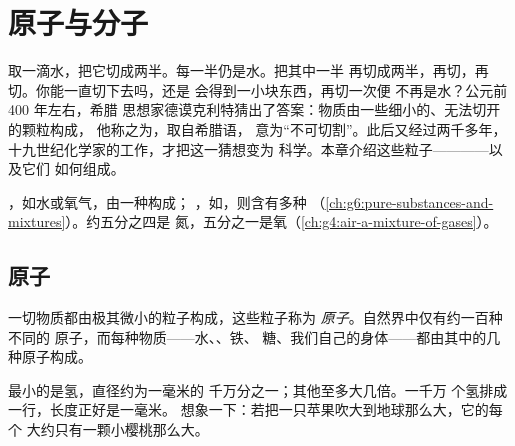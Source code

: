 \chapter{原子与分子}\label{ch:g7:atoms-and-molecules}

取一滴水，把它切成两半。每一半仍是水。把其中一半
再切成两半，再切，再切。你能一直切下去吗，还是
会得到一小块东西，再切一次便
不再是水？公元前 400 年左右，希腊
思想家德谟克利特猜出了答案：物质由一些细小的、无法切开的颗粒构成，
他称之为\emph{}，取自希腊语，
意为“不可切割”。此后又经过两千多年，
十九世纪化学家的工作，才把这一猜想变为
科学。本章介绍这些粒子————以及它们
如何组成。

\begin{recall}
，如水或氧气，由一种构成；
，如，则含有多种
（\cref{ch:g6:pure-substances-and-mixtures}）。约五分之四是
氮，五分之一是氧（\cref{ch:g4:air-a-mixture-of-gases}）。
\end{recall}

\section{原子}

\begin{definition}[原子]\label{def:g7:atoms-and-molecules:atom}
一切物质都由极其微小的粒子构成，这些粒子称为
\emph{原子}。自然界中仅有约一百种不同的
原子，而每种物质——水、、铁、
糖、我们自己的身体——都由其中的几种原子构成。
\end{definition}

\begin{proposition}[原子很小]\label{prop:g7:atoms-and-molecules:tiny}
最小的是氢，直径约为一毫米的
千万分之一；其他至多大几倍。一千万
个氢排成一行，长度正好是一毫米。
想象一下：若把一只苹果吹大到地球那么大，它的每个
大约只有一颗小樱桃那么大。
\end{proposition}

